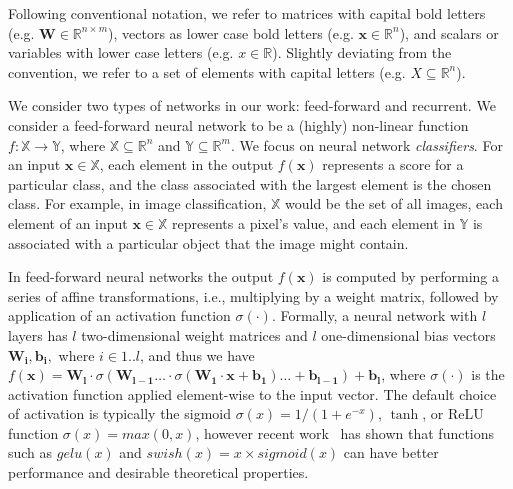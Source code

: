 Following conventional notation, we refer to matrices with capital bold letters
(e.g. $ \mathbf{W} \in \mathbb{R}^{n \times m}$), vectors as lower case bold
letters (e.g. $ \mathbf{x} \in \mathbb{R}^n $), and scalars or variables with
lower case letters (e.g. $ x \in \mathbb{R} $). Slightly deviating from the
convention, we refer to a set of elements with capital letters (e.g. $ X
\subseteq \mathbb{R}^n $).

We consider two types of networks in our work: feed-forward and recurrent. We
consider a feed-forward neural network to be a (highly) non-linear function $f :
\mathbb{X} \to \mathbb{Y} $, where $\mathbb{X} \subseteq \mathbb{R}^n$ and $
\mathbb{Y} \subseteq \mathbb{R}^m $. We focus on neural network
\textit{classifiers}. For an input $ \mathbf{x} \in \mathbb{X} $, each element
in the output $ f(\mathbf{x}) $ represents a score for a particular class, and
the class
associated with the largest element is the chosen class. For example, in image
classification, $ \mathbb{X} $ would be the set of all images, each element of
an input $ \mathbf{x} \in \mathbb{X} $ represents a pixel's value, and each
element in $ \mathbb{Y} $ is associated with a particular object that the image
might contain.


In feed-forward neural networks the output $ f(\mathbf{x}) $ is computed by
performing a
series of affine transformations, i.e., multiplying by a weight matrix, followed
by application of an activation function $ \sigma(\cdot) $. Formally, a neural
network with $ l $ layers has $ l $ two-dimensional weight matrices and $ l $
one-dimensional bias vectors $ \mathbf{W_i}, \mathbf{b_i},$ where $i
\in {1..l}
$, and thus we have $ f(\mathbf{x}) = \mathbf{W_l} \cdot \sigma(\mathbf{W_{l-1}}
\dots \cdot \sigma(\mathbf{W_1} \cdot \mathbf{x} + \mathbf{b_1}) \dots +
\mathbf{b_{l-1}}) + \mathbf{b_l} $, where $ \sigma(
\cdot ) $
is the activation function applied element-wise
to the input vector. The default choice of activation is typically the
sigmoid $ \sigma(x) = 1 / (1 + e^{-x}) $, $ \tanh{} $, or ReLU
function $\sigma(x) = max(0, x) $, however recent
work~\cite{hendrycks2016gaussian,ramachandran2017searching,radford2018improving}
 has shown that functions such as $ gelu(x) $ and $ \mathit{swish}(x) = x
\times \mathit{sigmoid}(x) $ can have better performance and desirable
theoretical properties.

